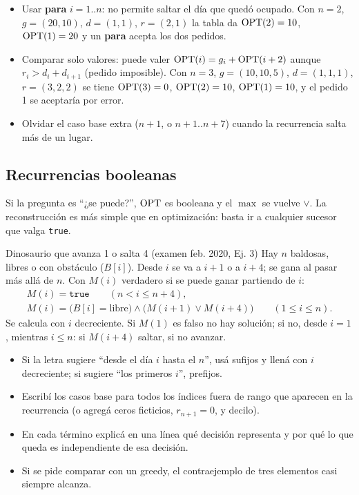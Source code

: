 \begin{trampa}
\begin{itemize}[leftmargin=1.2em]
  \item Usar \textbf{para} $i=1..n$: no permite saltar el día que quedó
  ocupado. Con $n=2$, $g=(20,10)$, $d=(1,1)$, $r=(2,1)$ la tabla da
  $\mathrm{OPT}(2)=10$, $\mathrm{OPT}(1)=20$ y un \textbf{para} acepta los dos pedidos.
  \item Comparar solo valores: puede valer $\mathrm{OPT}(i)=g_i+\mathrm{OPT}(i+2)$ aunque
  $r_i>d_i+d_{i+1}$ (pedido imposible). Con $n=3$, $g=(10,10,5)$,
  $d=(1,1,1)$, $r=(3,2,2)$ se tiene $\mathrm{OPT}(3)=0$, $\mathrm{OPT}(2)=10$, $\mathrm{OPT}(1)=10$,
  y el pedido 1 se aceptaría por error.
  \item Olvidar el caso base extra ($n+1$, o $n+1..n+7$) cuando la recurrencia
  salta más de un lugar.
\end{itemize}
\end{trampa}

\subsection{Recurrencias booleanas}

Si la pregunta es ``¿se puede?'', $\mathrm{OPT}$ es booleana y el $\max$ se vuelve
$\lor$. La reconstrucción es más simple que en optimización: basta ir a
cualquier sucesor que valga \texttt{true}.

\begin{problema}{Dinosaurio que avanza 1 o salta 4 (examen feb. 2020, Ej. 3)}
Hay $n$ baldosas, libres o con obstáculo ($B[i]$). Desde $i$ se va a $i+1$ o a
$i+4$; se gana al pasar más allá de $n$. Con $M(i)$ verdadero si se puede
ganar partiendo de $i$:
\begin{gather*}
M(i)=\texttt{true}\qquad (n<i\le n+4),\\
M(i)=\bigl(B[i]=\text{libre}\bigr)\wedge\bigl(M(i+1)\vee M(i+4)\bigr)\qquad (1\le i\le n).
\end{gather*}
Se calcula con $i$ decreciente. Si $M(1)$ es falso no hay solución; si no,
desde $i=1$, mientras $i\le n$: si $M(i+4)$ saltar, si no avanzar.
\end{problema}

\begin{receta}
\begin{itemize}[leftmargin=1.2em]
  \item Si la letra sugiere ``desde el día $i$ hasta el $n$'', usá sufijos y
  llená con $i$ decreciente; si sugiere ``los primeros $i$'', prefijos.
  \item Escribí los casos base para todos los índices fuera de rango que
  aparecen en la recurrencia (o agregá ceros ficticios, $r_{n+1}=0$, y decilo).
  \item En cada término explicá en una línea qué decisión representa y por
  qué lo que queda es independiente de esa decisión.
  \item Si se pide comparar con un greedy, el contraejemplo de tres elementos
  casi siempre alcanza.
\end{itemize}
\end{receta}

